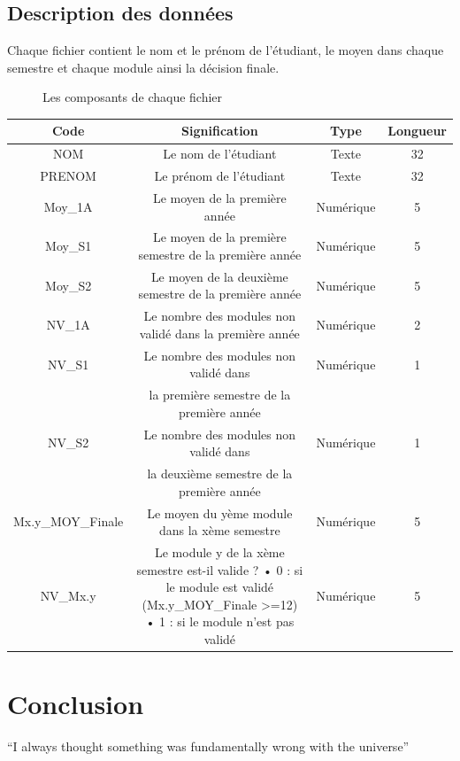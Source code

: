 \documentclass{article}
\begin{document}
            \subsection{Description des données}
                Chaque fichier contient le nom et le prénom de l’étudiant, le moyen dans chaque semestre et chaque module ainsi la décision finale.\\
                \begin{figure}[h!]
                    \centering
                    \caption{Les composants de chaque fichier}
                    \label{fig:columns}
                \end{figure} 
                \begin{flushright}
                    \begin{tabular}{| c | c | c | c | }
                        \hline
                        Code & Signification & Type & Longueur \\ \hline
                        NOM & Le nom de l’étudiant & Texte & 32 \\  \hline
                        PRENOM & Le prénom de l’étudiant & Texte & 32 \\ \hline
                        Moy_1A & Le moyen de la première année & Numérique & 5 \\  \hline
                        Moy_S1 & Le moyen de la première semestre de la première année & Numérique & 5 \\  \hline
                        Moy_S2 & Le moyen de la deuxième semestre de la première année & Numérique & 5 \\  \hline
                        NV_1A & Le nombre des modules non validé dans la première année & Numérique & 2 \\  \hline
                        NV_S1 & Le nombre des modules non validé dans & Numérique & 1 \\ 
                        & la première semestre de la première année & & \\ \hline
                        NV_S2 & Le nombre des modules non validé dans & Numérique & 1 \\
                        & la deuxième semestre de la première année & & \\ \hline
                        Mx.y_MOY_Finale & Le moyen du yème module dans la xème semestre & Numérique & 5 \\  \hline
                        NV_Mx.y & Le module y de la xème semestre est-il valide ?
•	0 : si le module est validé (Mx.y_MOY_Finale >=12)
•	1 : si le module n’est pas validé
 & Numérique & 5 \\  \hline
                        \hline
                    \end{tabular}
                \end{flushright}
\section{Conclusion}
``I always thought something was fundamentally wrong with the universe'' \citep{adams1995hitchhiker}



\end{document}
